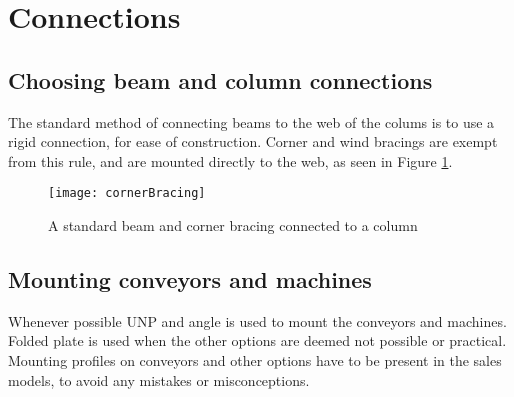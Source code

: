 \section{Connections}

\subsection{Choosing beam and column connections}
The standard method of connecting beams to the web of the colums is to use a rigid connection, for ease of construction. Corner and wind bracings are exempt from this rule, and are mounted directly to the web, as seen in Figure \ref{fig:cornerBracing}.


\begin{figure}[H]
\texttt{[image: cornerBracing]}
\caption{A standard beam and corner bracing connected to a column}\label{fig:cornerBracing}
\end{figure}

\subsection{Mounting conveyors and machines}
Whenever possible UNP and angle is used to mount the conveyors and machines. Folded plate is used when the other options are deemed not possible or practical.\\
Mounting profiles on conveyors and other options have to be present in the sales models, to avoid any mistakes or misconceptions.\\